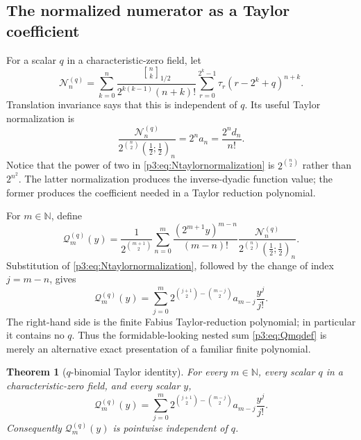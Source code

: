 \documentclass[11pt,oneside]{article}
\newtheorem{theorem}{Theorem}[section]
\theoremstyle{definition}
\theoremstyle{remark}
\newcommand{\qpoch}[3]{\left(#1;#2\right)_{#3}}
\newcommand{\halfqbinom}[2]{{\genfrac{[}{]}{0pt}{}{#1}{#2}}_{1/2}}
\newcommand{\N}{\mathbb N}
\newcommand{\tm}{\tau}
\begin{document}
\subsection{The normalized numerator as a Taylor coefficient}

For a scalar $q$ in a characteristic-zero field, let
\begin{equation}\label{p3:eq:Nnqscalar}
 \mathcal N_n^{(q)}=
 \sum_{k=0}^{n}
 \frac{\halfqbinom{n}{k}}
      {2^{k(k-1)}(n+k)!}
 \sum_{r=0}^{2^k-1}
 \tm_r(r-2^k+q)^{n+k}.
\end{equation}
Translation invariance says that this is independent of $q$.  Its useful
Taylor normalization is
\begin{equation}\label{p3:eq:Ntaylornormalization}
 \boxed{
 \frac{\mathcal N_n^{(q)}}
      {2^{\binom n2}\qpoch{\frac12}{\frac12}{n}}
 =2^na_n=\frac{2^nd_n}{n!}.}
\end{equation}
Notice that the power of two in \eqref{p3:eq:Ntaylornormalization} is
$2^{\binom n2}$ rather than $2^{n^2}$.  The latter normalization produces
the inverse-dyadic function value; the former produces the coefficient
needed in a Taylor reduction polynomial.

For $m\in\N$, define
\begin{equation}\label{p3:eq:Qmqdef}
 \mathcal Q_m^{(q)}(y)=
 \frac1{2^{\binom{m+1}{2}}}
 \sum_{n=0}^{m}
 \frac{(2^{m+1}y)^{m-n}}{(m-n)!}
 \frac{\mathcal N_n^{(q)}}
      {2^{\binom n2}\qpoch{\frac12}{\frac12}{n}}.
\end{equation}
Substitution of \eqref{p3:eq:Ntaylornormalization}, followed by the change of
index $j=m-n$, gives
\begin{equation}\label{p3:eq:QTaylor}
 \mathcal Q_m^{(q)}(y)
 =\sum_{j=0}^{m}
 2^{\binom{j+1}{2}-\binom{m-j}{2}}
 a_{m-j}\frac{y^j}{j!}.
\end{equation}
The right-hand side is the finite Fabius Taylor-reduction polynomial; in
particular it contains no $q$.  Thus the formidable-looking nested sum
\eqref{p3:eq:Qmqdef} is merely an alternative exact presentation of a familiar
finite polynomial.

\begin{theorem}[$q$-binomial Taylor identity]\label{p3:thm:qTaylor}
For every $m\in\N$, every scalar $q$ in a characteristic-zero field, and
every scalar $y$,
\begin{equation}\label{p3:eq:qTayloridentity}
 \boxed{\mathcal Q_m^{(q)}(y)=
 \sum_{j=0}^{m}
 2^{\binom{j+1}{2}-\binom{m-j}{2}}
 a_{m-j}\frac{y^j}{j!}.}
\end{equation}
Consequently $\mathcal Q_m^{(q)}(y)$ is pointwise independent of $q$.
\end{theorem}
\end{document}
